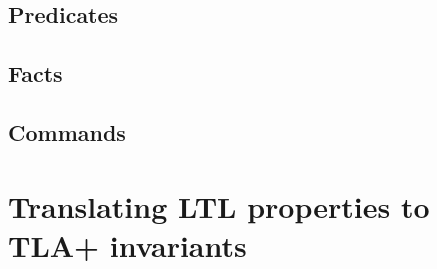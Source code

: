 \subsection{Predicates}

\subsection{Facts}

\subsection{Commands}


\section{Translating LTL properties to TLA+ invariants}
